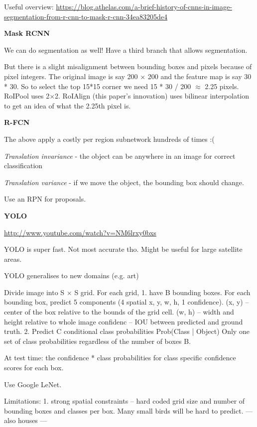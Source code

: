 \documentclass[12pt, a4paper, oneside, headinclude, footinclude]{article}
\begin{document}
Useful overview:
\url{https://blog.athelas.com/a-brief-history-of-cnns-in-image-segmentation-from-r-cnn-to-mask-r-cnn-34ea83205de4}

\textbf{Mask RCNN}~\cite{he2017}

We can do segmentation as well! Have a third branch that allows segmentation. 

But there is a slight misalignment between bounding boxes and pixels because
of pixel integers. The original image is say 200 $\times$ 200 and the feature map is
say 30 * 30. So to select the top 15*15 corner we need 15 * 30 / 200 $\approx$
2.25 pixels. RoIPool uses 2$\times$2. RoIAlign (this paper's innovation) uses
bilinear interpolation to get an idea of what the 2.25th pixel is.


\textbf{R-FCN}~\cite{NIPS2016_6465}

The above apply a costly per region subnetwork hundreds of times :(

\textit{Translation invariance} - the object can be anywhere in an image for
correct classification

\textit{Translation variance} - if we move the object, the bounding box should
change. 

Use an RPN for proposals.

\textbf{YOLO}~\cite{redmon2016yolo}

\url{http://www.youtube.com/watch?v=NM6lrxy0bxs}

YOLO is super fast. Not most accurate tho. Might be useful for large satellite
areas.

YOLO generalises to new domains (e.g. art)

Divide image into S $\times$ S grid. 
For each grid, 
    1. have B bounding boxes. 
    For each bounding box, 
        predict 5 components (4 spatial {x, y, w, h}, 1 confidence). 
        (x, y) -- center of the box relative to the bounds of the grid cell. 
        (w, h) -- width and height relative to whole image
        confidenc -- IOU between predicted and ground truth.
    2. Predict C conditional class probabilities
       Prob(Class | Object)
       Only one set of class probabilities regardless of the number of boxes
       B.

At test time: the confidence * class probabilities for class specific
confidence scores for each box.

Use Google LeNet.

Limitations: 
1. strong spatial constraints -- hard coded grid size and number of
bounding boxes and classes per box. Many small birds will be hard to predict.
--- also houses ---
\end{document}
